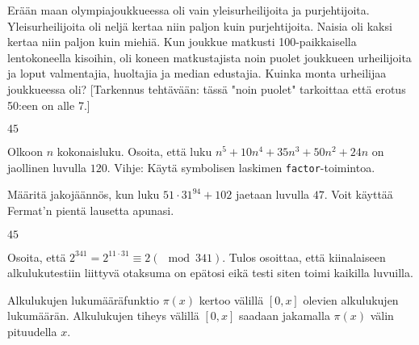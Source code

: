 \begin{kotitehtavasivu}
\begin{tehtava}
    Erään maan olympiajoukkueessa oli vain yleisurheilijoita ja
    purjehtijoita. Yleisurheilijoita oli neljä kertaa niin paljon kuin
    purjehtijoita. Naisia oli kaksi kertaa niin paljon kuin miehiä.
    Kun joukkue matkusti 100-paikkaisella lentokoneella kisoihin,
    oli koneen matkustajista noin puolet joukkueen urheilijoita ja
    loput valmentajia, huoltajia ja median edustajia. Kuinka monta
    urheilijaa joukkueessa oli? [Tarkennus tehtävään: tässä "noin puolet" tarkoittaa että erotus 50:een on alle 7.] %
    
    \begin{vastaus}
        $45$
    \end{vastaus}
    
\end{tehtava}

\begin{tehtava}
    Olkoon $n$ kokonaisluku. Osoita, että luku $n^5+10n^4+35n^3+50n^2+24n$ on jaollinen luvulla $120$. Vihje: Käytä symbolisen laskimen {\tt factor}-toimintoa.
\end{tehtava}


\begin{tehtava}
    Määritä jakojäännös, kun luku $51\cdot 31^{94}+102$ jaetaan
    luvulla $47$. Voit käyttää Fermat'n pientä lausetta apunasi.
    \begin{vastaus}
    $45$
    \end{vastaus}
\end{tehtava}

\begin{tehtava}
    Osoita, että $2^{341} = 2^{11 \cdot 31} \equiv 2 (\mod 341)
    $. Tulos osoittaa, että kiinalaiseen alkulukutestiin liittyvä
    otaksuma on epätosi eikä testi siten toimi kaikilla luvuilla.
\end{tehtava}

\begin{tehtava}
    Alkulukujen lukumääräfunktio $\pi(x)$ kertoo välillä $[0, x]$
    olevien alkulukujen lukumäärän. Alkulukujen tiheys välillä $[0, x]
    $ saadaan jakamalla $\pi(x)$ välin pituudella $x$.
\end{tehtava}
\end{kotitehtavasivu}
